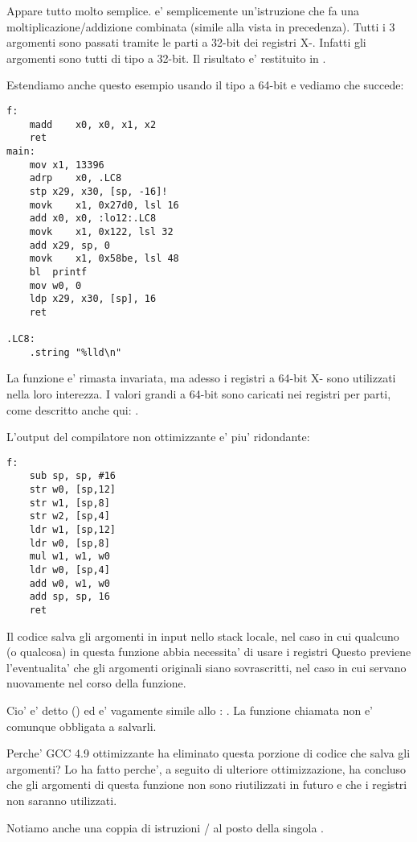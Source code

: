 

Appare tutto molto semplice.
 e' semplicemente un'istruzione che fa una moltiplicazione/addizione combinata (simile alla  vista in precedenza).
Tutti i 3 argomenti sono passati tramite le parti a 32-bit dei registri X-.
Infatti gli argomenti sono tutti di tipo  a 32-bit.
Il risultato e' restituito in .



Estendiamo anche questo esempio usando il tipo  a 64-bit e vediamo che succede:



\begin{lstlisting}
f:
	madd	x0, x0, x1, x2
	ret
main:
	mov	x1, 13396
	adrp	x0, .LC8
	stp	x29, x30, [sp, -16]!
	movk	x1, 0x27d0, lsl 16
	add	x0, x0, :lo12:.LC8
	movk	x1, 0x122, lsl 32
	add	x29, sp, 0
	movk	x1, 0x58be, lsl 48
	bl	printf
	mov	w0, 0
	ldp	x29, x30, [sp], 16
	ret

.LC8:
	.string	"%lld\n"
\end{lstlisting}

La funzione \ttf{} e' rimasta invariata, ma adesso i registri a 64-bit X- sono utilizzati nella loro interezza.
I valori grandi a 64-bit sono caricati nei registri per parti, come descritto anche qui: .


L'output del compilatore non ottimizzante e' piu' ridondante:

\begin{lstlisting}
f:
	sub	sp, sp, #16
	str	w0, [sp,12]
	str	w1, [sp,8]
	str	w2, [sp,4]
	ldr	w1, [sp,12]
	ldr	w0, [sp,8]
	mul	w1, w1, w0
	ldr	w0, [sp,4]
	add	w0, w1, w0
	add	sp, sp, 16
	ret
\end{lstlisting}

Il codice salva gli argomenti in input nello stack locale, nel caso in cui qualcuno (o qualcosa) in questa funzione abbia necessita' 
di usare i registri  
Questo previene l'eventualita' che gli argomenti originali siano sovrascritti, nel caso in cui servano nuovamente nel corso della funzione.

Cio' e' detto  (\ARMPCS) ed e' vagamente simile allo : .
La funzione chiamata non e' comunque obbligata a salvarli.

Perche' GCC 4.9 ottimizzante ha eliminato questa porzione di codice che salva gli argomenti?
Lo ha fatto perche', a seguito di ulteriore ottimizzazione, ha concluso che gli argomenti di questa funzione non sono riutilizzati in futuro e
che i registri  non saranno utilizzati.


Notiamo anche una coppia di istruzioni / al posto della singola .
